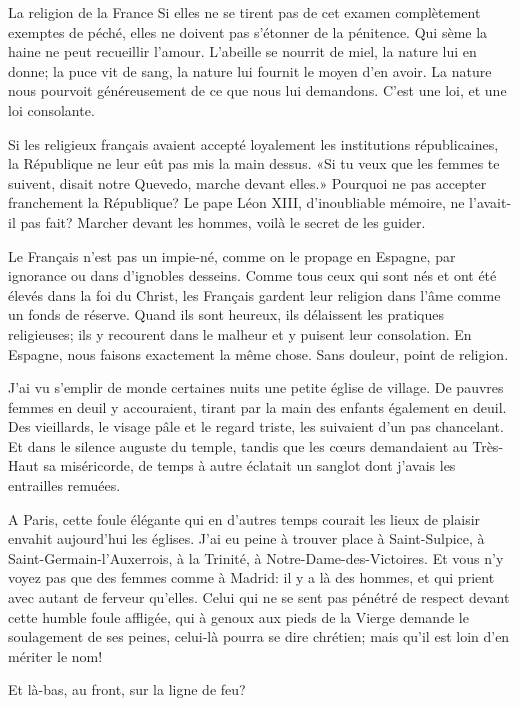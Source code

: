 \begin{chapter}{La religion de la France}
Si elles ne se tirent pas de cet examen complètement exemptes de péché,
elles ne doivent pas s'étonner de la pénitence. Qui sème la haine ne
peut recueillir l'amour. L'abeille se nourrit de miel, la nature lui en
donne; la puce vit de sang, la nature lui fournit le moyen d'en avoir.
La nature nous pourvoit généreusement de ce que nous lui demandons.
C'est une loi, et une loi consolante.

Si les religieux français avaient accepté loyalement les institutions
républicaines, la République ne leur eût pas mis la main dessus. «Si tu
veux que les femmes te suivent, disait notre Quevedo, marche devant
elles.» Pourquoi ne pas accepter franchement la République? Le pape Léon
XIII, d'inoubliable mémoire, ne l'avait-il pas fait? Marcher devant les
hommes, voilà le secret de les guider.

\horizontalLine

Le Français n'est pas un impie-né, comme on le propage en Espagne, par
ignorance ou dans d'ignobles desseins. Comme tous ceux qui sont nés et
ont été élevés dans la foi du Christ, les Français gardent leur
religion dans l'âme comme un fonds de réserve. Quand ils sont heureux,
ils délaissent les pratiques religieuses; ils y recourent dans le
malheur et y puisent leur consolation. En Espagne, nous faisons
exactement la même chose. Sans douleur, point de religion.

J'ai vu s'emplir de monde certaines nuits une petite église de village.
De pauvres femmes en deuil y accouraient, tirant par la main des enfants
également en deuil. Des vieillards, le visage pâle et le regard triste,
les suivaient d'un pas chancelant. Et dans le silence auguste du temple,
tandis que les cœurs demandaient au Très-Haut sa miséricorde, de
temps à autre éclatait un sanglot dont j'avais les entrailles remuées.

A Paris, cette foule élégante qui en d'autres temps courait les lieux de
plaisir envahit aujourd'hui les églises. J'ai eu peine à trouver place
à Saint-Sulpice, à Saint-Germain-l'Auxerrois, à la Trinité, à
Notre-Dame-des-Victoires. Et vous n'y voyez pas que des femmes comme à
Madrid: il y a là des hommes, et qui prient avec autant de ferveur
qu'elles. Celui qui ne se sent pas pénétré de respect devant cette
humble foule affligée, qui à genoux aux pieds de la Vierge demande le
soulagement de ses peines, celui-là pourra se dire chrétien; mais qu'il
est loin d'en mériter le nom!

Et là-bas, au front, sur la ligne de feu?


\end{chapter}
